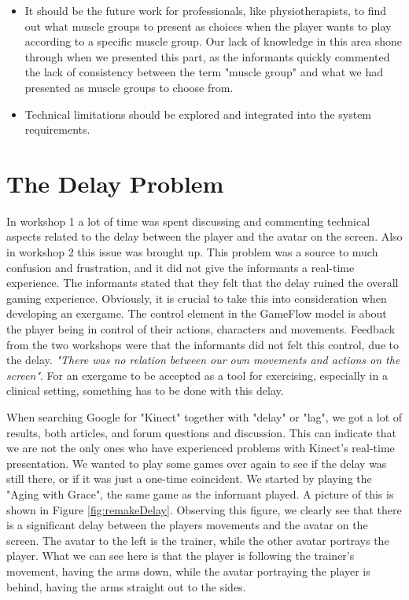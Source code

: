 \begin{itemize}
\item It should be the future work for professionals, like physiotherapists, to find out what muscle groups to present as choices when the player wants to play according to a specific muscle group. Our lack of knowledge in this area shone through when we presented this part, as the informants quickly commented the lack of consistency between the term "muscle group" and what we had presented as muscle groups to choose from. 
\item Technical limitations should be explored and integrated into the system requirements.
\end{itemize}
 
\section{The Delay Problem}
\label{sec:delay}
In workshop 1 a lot of time was spent discussing and commenting technical aspects related to the delay between the player and the avatar on the screen.  Also in workshop 2 this issue was brought up. This problem was a source to much confusion and frustration, and it did not give the informants a real-time experience. The informants stated that they felt that the delay ruined the overall gaming experience. Obviously, it is crucial to take this into consideration when developing an exergame. The control element in the GameFlow model \cite{sweetser} is about the player being in control of their actions, characters and movements. Feedback from the two workshops were that the informants did not felt this control, due to the delay. \emph{"There was no relation between our own movements and actions on the screen"}. For an exergame to be accepted as a tool for exercising, especially in a clinical setting, something has to be done with this delay. 

When searching Google for "Kinect" together with "delay" or "lag", we got a lot of results, both articles, and forum questions and discussion. This can indicate that we are not the only ones who have experienced problems with Kinect's real-time presentation. We wanted to play some games over again to see if the delay was still there, or if it was just a one-time coincident. We started by playing the "Aging with Grace", the same game as the informant played. A picture of this is shown in Figure \ref{fig:remakeDelay}. Observing this figure, we clearly see that there is a significant delay between the players movements and the avatar on the screen. The avatar to the left is the trainer, while the other avatar portrays the player. What we can see here is that the player is following the trainer's movement, having the arms down, while the avatar portraying the player is behind, having the arms straight out to the sides.


